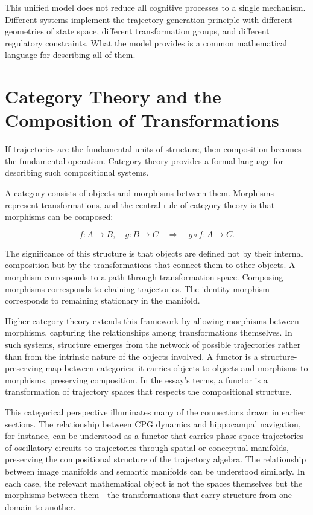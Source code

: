 \documentclass[11pt, a4paper]{article}
\theoremstyle{plain}
\theoremstyle{definition}
\theoremstyle{remark}
\begin{document}
This unified model does not reduce all cognitive processes to a single mechanism.
Different systems implement the trajectory-generation principle with different geometries
of state space, different transformation groups, and different regulatory constraints.
What the model provides is a common mathematical language for describing all of them.


\section{Category Theory and the Composition of Transformations}

If trajectories are the fundamental units of structure, then composition becomes the
fundamental operation. Category theory provides a formal language for describing such
compositional systems.

A category consists of objects and morphisms between them. Morphisms represent
transformations, and the central rule of category theory is that morphisms can be
composed:

\begin{equation}
f : A \to B, \quad g : B \to C
\quad \Rightarrow \quad
g \circ f : A \to C.
\end{equation}

The significance of this structure is that objects are defined not by their internal
composition but by the transformations that connect them to other objects. A morphism
corresponds to a path through transformation space. Composing morphisms corresponds to
chaining trajectories. The identity morphism corresponds to remaining stationary in the
manifold.

Higher category theory extends this framework by allowing morphisms between morphisms,
capturing the relationships among transformations themselves. In such systems, structure
emerges from the network of possible trajectories rather than from the intrinsic nature
of the objects involved. A functor is a structure-preserving map between categories: it
carries objects to objects and morphisms to morphisms, preserving composition. In the
essay's terms, a functor is a transformation of trajectory spaces that respects the
compositional structure.

This categorical perspective illuminates many of the connections drawn in earlier
sections. The relationship between CPG dynamics and hippocampal navigation, for instance,
can be understood as a functor that carries phase-space trajectories of oscillatory
circuits to trajectories through spatial or conceptual manifolds, preserving the
compositional structure of the trajectory algebra. The relationship between image
manifolds and semantic manifolds can be understood similarly. In each case, the relevant
mathematical object is not the spaces themselves but the morphisms between them---the
transformations that carry structure from one domain to another.
\end{document}
